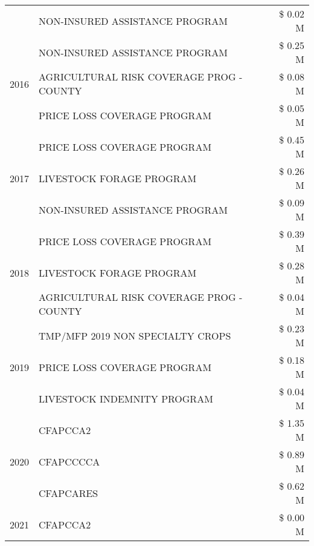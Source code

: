 \begin{tabular}{llr}
 & NON-INSURED ASSISTANCE PROGRAM & \$ 0.02 M \\
\cline{1-3}
\multirow[t]{3}{*}{2016} & NON-INSURED ASSISTANCE PROGRAM & \$ 0.25 M \\
 & AGRICULTURAL RISK COVERAGE PROG - COUNTY & \$ 0.08 M \\
 & PRICE LOSS COVERAGE PROGRAM & \$ 0.05 M \\
\cline{1-3}
\multirow[t]{3}{*}{2017} & PRICE LOSS COVERAGE PROGRAM & \$ 0.45 M \\
 & LIVESTOCK FORAGE PROGRAM & \$ 0.26 M \\
 & NON-INSURED ASSISTANCE PROGRAM & \$ 0.09 M \\
\cline{1-3}
\multirow[t]{3}{*}{2018} & PRICE LOSS COVERAGE PROGRAM & \$ 0.39 M \\
 & LIVESTOCK FORAGE PROGRAM & \$ 0.28 M \\
 & AGRICULTURAL RISK COVERAGE PROG - COUNTY & \$ 0.04 M \\
\cline{1-3}
\multirow[t]{3}{*}{2019} & TMP/MFP 2019 NON SPECIALTY CROPS & \$ 0.23 M \\
 & PRICE LOSS COVERAGE PROGRAM & \$ 0.18 M \\
 & LIVESTOCK INDEMNITY PROGRAM & \$ 0.04 M \\
\cline{1-3}
\multirow[t]{3}{*}{2020} & CFAPCCA2 & \$ 1.35 M \\
 & CFAPCCCCA & \$ 0.89 M \\
 & CFAPCARES & \$ 0.62 M \\
\cline{1-3}
2021 & CFAPCCA2 & \$ 0.00 M \\
\cline{1-3}
\bottomrule
\end{tabular}
